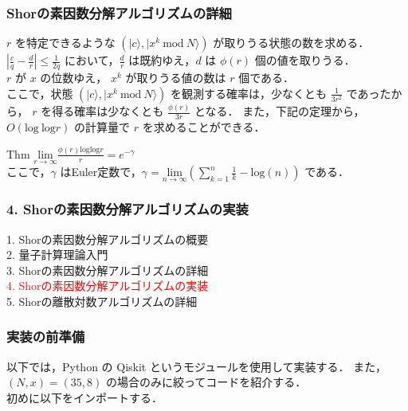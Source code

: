 \documentclass[dvipdfmx,12pt]{beamer}
\begin{document}
\begin{frame}

\frametitle{Shorの素因数分解アルゴリズムの詳細}

$r$ を特定できるような $ ( | c \rangle, | x^k \ \mathrm{mod} \ N \rangle ) $ が取りうる状態の数を求める．\\
$ \left| \frac{c}{q} - \frac{d}{r} \right| \leq \frac{1}{2q} $ において，$ \frac{d}{r} $ は既約ゆえ，$d$ は $\phi(r)$ 個の値を取りうる． \\
$r$ が $x$ の位数ゆえ， $ x^k $ が取りうる値の数は $r$ 個である． \\
ここで，状態 $ ( | c \rangle, | x^k \ \mathrm{mod} \ N \rangle ) $ を観測する確率は，少なくとも $ \displaystyle \frac{1}{3 r^2} $ であったから，
$r$ を得る確率は少なくとも $ \displaystyle \frac{\phi(r)}{3r} $ となる．
また，下記の定理\cite{HW}から，$ O(\mathrm{log} \ \mathrm{log} r) $ の計算量で $r$ を求めることができる．

\begin{itembox}[l]{Thm}
    $ \displaystyle \underset{r \rightarrow \infty}{\mathrm{lim}} \frac{\phi(r) \mathrm{log} \mathrm{log} r}{r} = e^{- \gamma} $ \\
    ここで，$ \gamma $ はEuler定数で，$ \displaystyle \gamma = \underset{n \rightarrow \infty}{\mathrm{lim}} \left( \sum_{k = 1}^n \frac{1}{k} - \mathrm{log}(n) \right) $ である．
\end{itembox} 

\end{frame}


\begin{frame}

\frametitle{4. Shorの素因数分解アルゴリズムの実装}
                  
1. Shorの素因数分解アルゴリズムの概要 \\
2. 量子計算理論入門 \\
3. Shorの素因数分解アルゴリズムの詳細 \\
\textcolor{red}{4. Shorの素因数分解アルゴリズムの実装} \\
5. Shorの離散対数アルゴリズムの詳細
                      
\end{frame}


\begin{frame}

\frametitle{実装の前準備}
        
以下では，Python の Qiskit というモジュールを使用して実装する．
また，$(N, x) = (35, 8)$ の場合のみに絞ってコードを紹介する． \\

初めに以下をインポートする．

\vspace{10pt}




\end{frame}
\end{document}
